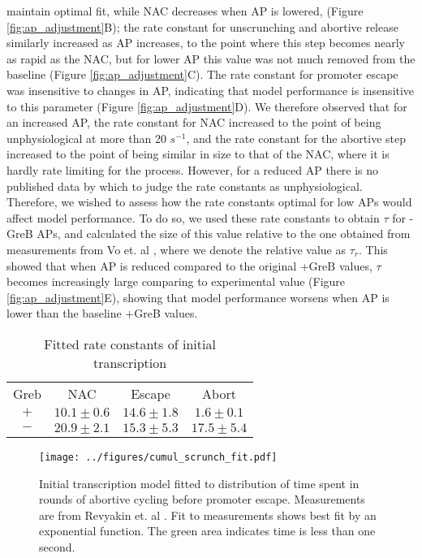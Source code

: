 maintain optimal fit, while NAC decreases when AP is lowered, (Figure
\ref{fig:ap_adjustment}B); the rate constant for unscrunching
and abortive release similarly increased as AP increases, to the point where
this step becomes nearly as rapid as the NAC, but for lower AP this value was
not much removed from the baseline (Figure \ref{fig:ap_adjustment}C). The rate
constant for promoter escape was insensitive to changes in AP, indicating that
model performance is insensitive to this parameter (Figure
\ref{fig:ap_adjustment}D). We therefore observed that for an increased AP, the
rate constant for NAC increased to the point of being unphysiological at more
than 20 $s^{-1}$, and the rate constant for the abortive step increased to the
point of being similar in size to that of the NAC, where it is hardly rate
limiting for the process. However, for a reduced AP there is no published data
by which to judge the rate constants as unphysiological. Therefore, we wished
to assess how the rate constants optimal for low APs would affect model
performance. To do so, we used these rate constants to obtain $\tau$ for -GreB
APs, and calculated the size of this value relative to the one obtained from
measurements from Vo et. al \cite{vo_vitro_2003-1}, where we denote the
relative value as $\tau_r$. This showed that when AP is reduced compared to the
original +GreB values, $\tau$ becomes increasingly large comparing to 
experimental value (Figure \ref{fig:ap_adjustment}E), showing that model
performance worsens when AP is lower than the baseline +GreB values.

\begin{table}
  \label{tab:param_fit_revyakin}
  \caption{Fitted rate constants of initial transcription}
  \begin{center}
    \begin{tabular}{cccc}
       \toprule
       Greb & NAC & Escape & Abort \\
       $+$ & $10.1 \pm 0.6$ & $14.6 \pm 1.8$ & $1.6 \pm 0.1$ \\
       $-$ & $20.9 \pm 2.1$ & $15.3 \pm 5.3$ & $17.5 \pm 5.4$ \\
    \end{tabular}
  \end{center}
\end{table}


\begin{figure}
    \begin{center}
      \texttt{[image: ../figures/cumul\_scrunch\_fit.pdf]}
    \end{center}
    \caption{Initial transcription model fitted to distribution of time spent
      in rounds of abortive cycling before promoter escape. Measurements are
      from Revyakin et. al \cite{revyakin_abortive_2006}. Fit to measurements
      shows best fit by an exponential function. The green area indicates time
      is less than one second.}
\label{fig:revyakin_fit}
\end{figure}


